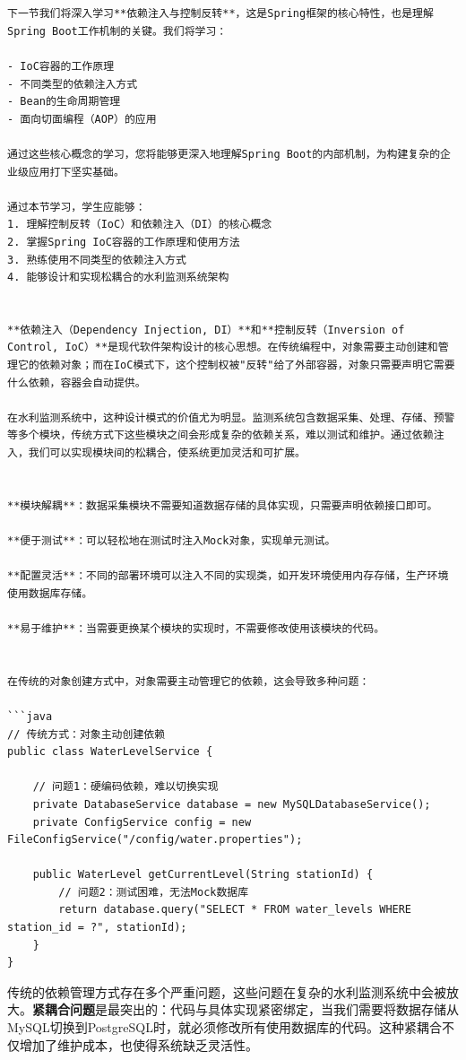 \begin{verbatim}


下一节我们将深入学习**依赖注入与控制反转**，这是Spring框架的核心特性，也是理解Spring Boot工作机制的关键。我们将学习：

- IoC容器的工作原理
- 不同类型的依赖注入方式
- Bean的生命周期管理
- 面向切面编程（AOP）的应用

通过这些核心概念的学习，您将能够更深入地理解Spring Boot的内部机制，为构建复杂的企业级应用打下坚实基础。

通过本节学习，学生应能够：
1. 理解控制反转（IoC）和依赖注入（DI）的核心概念
2. 掌握Spring IoC容器的工作原理和使用方法
3. 熟练使用不同类型的依赖注入方式
4. 能够设计和实现松耦合的水利监测系统架构


**依赖注入（Dependency Injection, DI）**和**控制反转（Inversion of Control, IoC）**是现代软件架构设计的核心思想。在传统编程中，对象需要主动创建和管理它的依赖对象；而在IoC模式下，这个控制权被"反转"给了外部容器，对象只需要声明它需要什么依赖，容器会自动提供。

在水利监测系统中，这种设计模式的价值尤为明显。监测系统包含数据采集、处理、存储、预警等多个模块，传统方式下这些模块之间会形成复杂的依赖关系，难以测试和维护。通过依赖注入，我们可以实现模块间的松耦合，使系统更加灵活和可扩展。


**模块解耦**：数据采集模块不需要知道数据存储的具体实现，只需要声明依赖接口即可。

**便于测试**：可以轻松地在测试时注入Mock对象，实现单元测试。

**配置灵活**：不同的部署环境可以注入不同的实现类，如开发环境使用内存存储，生产环境使用数据库存储。

**易于维护**：当需要更换某个模块的实现时，不需要修改使用该模块的代码。


在传统的对象创建方式中，对象需要主动管理它的依赖，这会导致多种问题：

```java
// 传统方式：对象主动创建依赖
public class WaterLevelService {
    
    // 问题1：硬编码依赖，难以切换实现
    private DatabaseService database = new MySQLDatabaseService();
    private ConfigService config = new FileConfigService("/config/water.properties");
    
    public WaterLevel getCurrentLevel(String stationId) {
        // 问题2：测试困难，无法Mock数据库
        return database.query("SELECT * FROM water_levels WHERE station_id = ?", stationId);
    }
}
\end{verbatim}

传统的依赖管理方式存在多个严重问题，这些问题在复杂的水利监测系统中会被放大。\textbf{紧耦合问题}是最突出的：代码与具体实现紧密绑定，当我们需要将数据存储从MySQL切换到PostgreSQL时，就必须修改所有使用数据库的代码。这种紧耦合不仅增加了维护成本，也使得系统缺乏灵活性。

